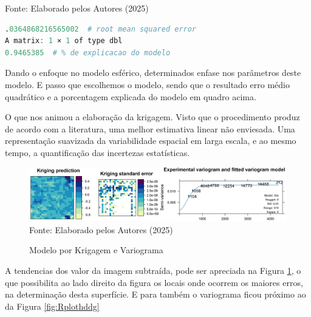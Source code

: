  			\begin{center}
 				Fonte:   Elaborado pelos Autores (2025)
 			\end{center}

\lstset{
	language=R, %
	caption= Resultado do modelo de superficie de tendencia de 3 grau saida da linguagem R} %
\begin{lstlisting}[language=R]
.0364868216565002  # root mean squared error
A matrix: 1 × 1 of type dbl
0.9465385  # % de explicacao do modelo
\end{lstlisting}   

 
\hspace*{1.25 cm} Dando o enfoque no modelo esférico,  determinados enfase nos parâmetros deste modelo. E passo que escolhemos o modelo, sendo que o resultado erro médio quadrático  e a porcentagem explicada do modelo em quadro acima. 
 
\hspace*{1.25 cm} O que nos animou a elaboração da krigagem. Visto que  o procedimento produz de acordo com a literatura, uma melhor estimativa linear não enviesada. Uma representação suavizada da variabilidade espacial em larga escala, e ao mesmo tempo, a quantificação das incertezas estatísticas. 
 	\begin{figure}[H]
	\centering  \small \caption{Modelo por Krigagem e Variograma}
	\includegraphics[width=0.957\linewidth]{FIGURAS/MODELOKRIGAGEM-1}
	\label{fig:rplotkriga}\\{ Fonte:   Elaborado pelos Autores (2025)}
\end{figure}
\hspace*{1.25 cm}  A tendencias dos valor da imagem subtraída,  pode ser apreciada na  Figura \ref{fig:rplotkriga}, o que possibilita ao lado direito da figura os locais onde ocorrem os maiores erros, na determinação desta superfície. E para também o variograma ficou próximo ao da Figura \ref{fig:Rplothddg} 

  

